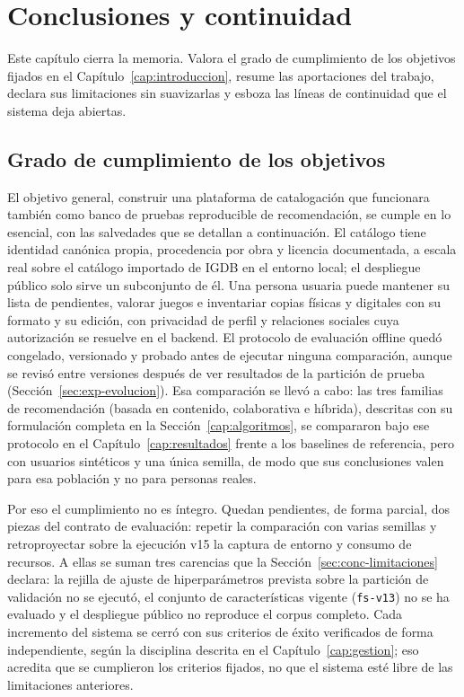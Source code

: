 \chapter{Conclusiones y continuidad}\label{cap:conclusiones}

Este capítulo cierra la memoria. Valora el grado de cumplimiento de los objetivos fijados en
el Capítulo~\ref{cap:introduccion}, resume las aportaciones del trabajo, declara sus
limitaciones sin suavizarlas y esboza las líneas de continuidad que el sistema deja abiertas.

\section{Grado de cumplimiento de los objetivos}\label{sec:conc-objetivos}

El objetivo general, construir una plataforma de catalogación que funcionara también como
banco de pruebas reproducible de recomendación, se cumple en lo esencial, con las salvedades que se detallan a
continuación. El catálogo tiene identidad canónica propia, procedencia por obra y licencia documentada, a escala
real sobre el catálogo importado de IGDB en el entorno local; el despliegue público solo sirve un subconjunto de
él. Una persona usuaria puede mantener su lista de pendientes, valorar juegos e inventariar copias físicas y
digitales con su formato y su edición, con privacidad de perfil y relaciones sociales cuya autorización se resuelve
en el backend. El protocolo de evaluación offline quedó congelado, versionado y probado antes de ejecutar ninguna
comparación, aunque se revisó entre versiones después de ver resultados de la partición de prueba
(Sección~\ref{sec:exp-evolucion}). Esa comparación se llevó a cabo: las tres familias de recomendación
(basada en contenido, colaborativa e híbrida), descritas con su formulación completa en la
Sección~\ref{cap:algoritmos}, se compararon bajo ese protocolo en el
Capítulo~\ref{cap:resultados} frente a los baselines de referencia, pero con usuarios sintéticos y una única
semilla, de modo que sus conclusiones valen para esa población y no para personas reales.

Por eso el cumplimiento no es íntegro. Quedan pendientes, de forma parcial, dos piezas del contrato de evaluación:
repetir la comparación con varias semillas y retroproyectar sobre la ejecución v15 la captura de entorno y consumo de
recursos. A ellas se suman tres carencias que la Sección~\ref{sec:conc-limitaciones} declara: la rejilla de ajuste
de hiperparámetros prevista sobre la partición de validación no se ejecutó, el conjunto de características vigente
(\texttt{fs-v13}) no se ha evaluado y el despliegue público no reproduce el corpus completo. Cada incremento del
sistema se cerró con sus criterios de éxito verificados de forma independiente, según la disciplina descrita en el
Capítulo~\ref{cap:gestion}; eso acredita que se cumplieron los criterios fijados, no que el sistema esté libre de
las limitaciones anteriores.

